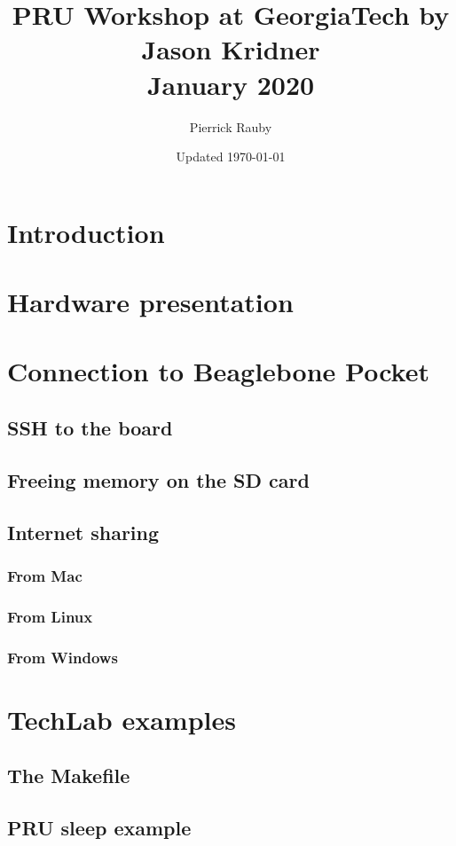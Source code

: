 \documentclass{article}
\title{ PRU Workshop at GeorgiaTech by Jason Kridner \\ January 2020}
\date{Updated \today}
\author{Pierrick Rauby}
\begin{document}
{}
\maketitle 
\tableofcontents

\newpage

\section{Introduction}

\section{Hardware presentation}

\section{Connection to Beaglebone Pocket}
\subsection{SSH to the board}
\subsection{Freeing memory on the SD card}
\subsection{Internet sharing}
\subsubsection{From Mac}
\subsubsection{From Linux}
\subsubsection{From Windows}

\section{TechLab examples}
\subsection{The Makefile}
\subsection{PRU sleep example}
\end{document}

